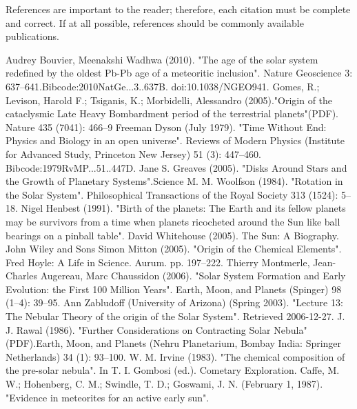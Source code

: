 \documentclass[letterpaper, 10 pt, conference]{ieeeconf}  %
\begin{document}


References are important to the reader; therefore, each citation must be complete and correct. If at all possible, references should be commonly available publications.



\begin{thebibliography}{99}
Audrey Bouvier, Meenakshi Wadhwa (2010). "The age of the solar system redefined by the oldest Pb-Pb age of a meteoritic inclusion". Nature Geoscience 3: 637–641.Bibcode:2010NatGe...3..637B. doi:10.1038/NGEO941.
Gomes, R.; Levison, Harold F.; Tsiganis, K.; Morbidelli, Alessandro (2005)."Origin of the cataclysmic Late Heavy Bombardment period of the terrestrial planets"(PDF). Nature 435 (7041): 466–9
Freeman Dyson (July 1979). "Time Without End: Physics and Biology in an open universe". Reviews of Modern Physics (Institute for Advanced Study, Princeton New Jersey) 51 (3): 447–460. Bibcode:1979RvMP...51..447D.
Jane S. Greaves (2005). "Disks Around Stars and the Growth of Planetary Systems".Science
M. M. Woolfson (1984). "Rotation in the Solar System". Philosophical Transactions of the Royal Society 313 (1524): 5–18.
Nigel Henbest (1991). "Birth of the planets: The Earth and its fellow planets may be survivors from a time when planets ricocheted around the Sun like ball bearings on a pinball table".
David Whitehouse (2005). The Sun: A Biography. John Wiley and Sons
Simon Mitton (2005). "Origin of the Chemical Elements". Fred Hoyle: A Life in Science. Aurum. pp. 197–222.
Thierry Montmerle, Jean-Charles Augereau, Marc Chaussidon (2006). "Solar System Formation and Early Evolution: the First 100 Million Years". Earth, Moon, and Planets (Spinger) 98 (1–4): 39–95.
Ann Zabludoff (University of Arizona) (Spring 2003). "Lecture 13: The Nebular Theory of the origin of the Solar System". Retrieved 2006-12-27.
J. J. Rawal (1986). "Further Considerations on Contracting Solar Nebula" (PDF).Earth, Moon, and Planets (Nehru Planetarium, Bombay India: Springer Netherlands) 34 (1): 93–100.
W. M. Irvine (1983). "The chemical composition of the pre-solar nebula". In T. I. Gombosi (ed.). Cometary Exploration.
Caffe, M. W.; Hohenberg, C. M.; Swindle, T. D.; Goswami, J. N. (February 1, 1987). "Evidence in meteorites for an active early sun".

\end{thebibliography}
\end{document}
